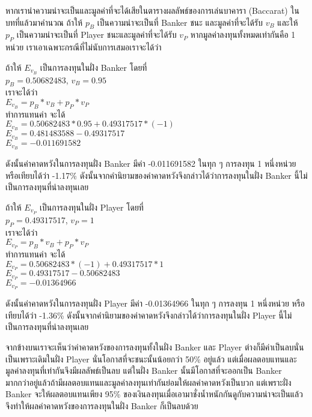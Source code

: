 \documentclass{article}
\begin{document}
หากเรานำความน่าจะเป็นและมูลค่าที่จะได้เสียในตารางผลลัพธ์ของการเล่นบาคารา (Baccarat) ในบทที่แล้วมาคำนวณ ถ้าให้ $p_B$ เป็นความน่าจะเป็นที่ Banker ชนะ และมูลค่าที่จะได้รับ $v_B$ และให้ $p_P$ เป็นความน่าจะเป็นที่ Player ชนะและมูลค่าที่จะได้รับ $v_P$ หากมูลค่าลงทุนทั้งหมดเท่ากันคือ 1 หน่วย เราเอาเฉพาะกรณีที่ไม่นับการเสมอเราจะได้ว่า 

\begin{center}
ถ้าให้ $E_{v_B}$ เป็นการลงทุนในฝั่ง Banker โดยที่\\
$p_B=0.50682483$, $v_B=0.95$\\
เราจะได้ว่า\\
$E_{v_B}=p_B*v_B+p_P*v_P$\\
ทำการแทนค่า จะได้\\
$E_{v_B}=0.50682483*0.95+0.49317517*(-1)$\\
$E_{v_B}=0.481483588-0.49317517$\\
$E_{v_B}=-0.011691582$\\
\end{center}

ดังนั้นค่าคาดหวังในการลงทุนฝั่ง Banker มีค่า -0.011691582 ในทุก ๆ การลงทุน 1 หนึ่งหน่วย หรือเทียบได้ว่า -1.17\% ดังนั้นจากคำนิยามของค่าคาดหวังจึงกล่าวได้ว่าการลงทุนในฝั่ง Banker นี้ไม่เป็นการลงทุนที่น่าลงทุนเลย 


\begin{center}
ถ้าให้ $E_{v_P}$ เป็นการลงทุนในฝั่ง Player โดยที่\\
$p_P=0.49317517$, $v_P=1$\\
เราจะได้ว่า\\
$E_{v_P}=p_B*v_B+p_P*v_P$\\
ทำการแทนค่า จะได้\\
$E_{v_P}=0.50682483*(-1)+0.49317517*1$\\
$E_{v_P}=0.49317517-0.50682483$\\
$E_{v_P}=-0.01364966$\\
\end{center}

ดังนั้นค่าคาดหวังในการลงทุนฝั่ง Player มีค่า -0.01364966 ในทุก ๆ การลงทุน 1 หนึ่งหน่วย หรือเทียบได้ว่า -1.36\% ดังนั้นจากคำนิยามของค่าคาดหวังจึงกล่าวได้ว่าการลงทุนในฝั่ง Player นี้ไม่เป็นการลงทุนที่น่าลงทุนเลย 

จากข้างบนเราจะเห็นว่าค่าคาดหวังของการลงทุนทั้งในฝั่ง Banker และ Player ต่างก็มีค่าเป็นลบนั่นเป็นเพราะเดิมในฝั่ง Player นั่นโอกาสที่จะชนะนั้นน้อยกว่า 50\% อยู่แล้ว แต่เมื่อผลตอบแทนและมูลค่าลงทุนที่เท่ากันจึงมีผลลัพธ์เป็นลบ แต่ในฝั่ง Banker นั้นมีโอกาสที่จะออกเป็น Banker มากกว่าอยู่แล้วถ้ามีผลตอบแทนและมูลค่าลงทุนเท่ากันย่อมให้ผลค่าคาดหวังเป็นบวก แต่เพราะฝั่ง Banker จะให้ผลตอบแทนเพียง 95\% ของเงินลงทุนเมื่อเอามาชั่งน้ำหนักกันดูกับความน่าจะเป็นแล้วจึงทำให้ผลค่าคาดหวังของการลงทุนในฝั่ง Banker ก็เป็นลบด้วย
\end{document}
